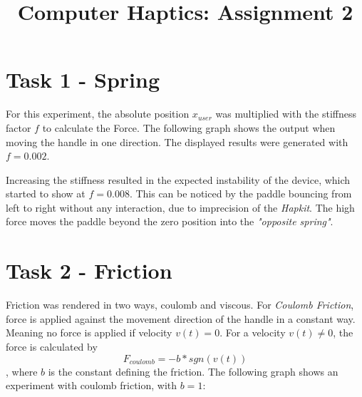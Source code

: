 



  \title{Computer Haptics: Assignment 2}
  \maketitle

  \section*{Task 1 - Spring}

  For this experiment, the absolute position $x_{user}$ was multiplied with the stiffness factor $f$ to calculate the Force. The following graph shows the output when moving the handle in one direction. The displayed results were generated with $f = 0.002$.

  \begin{figure}[H]
    \centering
  \end{figure}

  Increasing the stiffness resulted in the expected instability of the device, which started to show at $f = 0.008$. This can be noticed by the paddle bouncing from left to right without any interaction, due to imprecision of the \textit{Hapkit}. The high force moves the paddle beyond the zero position into the \textit{"opposite spring"}.

  \section*{Task 2 - Friction}

  Friction was rendered in two ways, coulomb and viscous. For \textit{Coulomb Friction}, force is applied against the movement direction of the handle in a constant way. Meaning no force is applied if velocity $v(t) = 0$. For a velocity $v(t) \neq 0$, the force is calculated by
  \begin{equation*}
    F_{coulomb} = -b * sgn(v(t))
  \end{equation*},
  where $b$ is the constant defining the friction. The following graph shows an experiment with coulomb friction, with $b = 1$:

